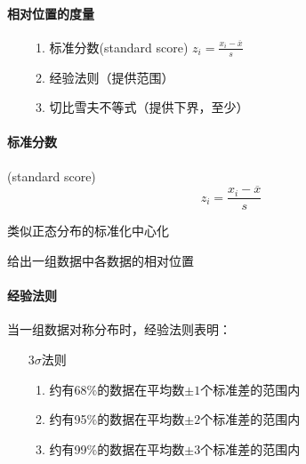 \documentclass[UTF8,10pt]{book}
\begin{document}
                \paragraph{相对位置的度量}
                    \begin{itemize}
                        \item [] {
                            \begin{enumerate}
                                \item 标准分数(standard score) $ z_i = \frac{x_i-\overline{x}}{s} $
                                \item 经验法则（提供范围）
                                \item 切比雪夫不等式（提供下界，至少）
                            
                            \end{enumerate}
                        }
                    \end{itemize}
                \paragraph{标准分数} (standard score) $$ z_i = \frac{x_i-\overline{x}}{s} $$

                {\kaishu 类似正态分布的标准化中心化}

                {\kaishu 给出一组数据中各数据的相对位置}

                \paragraph{经验法则} 当一组数据对称分布时，经验法则表明：
                    \begin{itemize}
                        \item [$3\sigma$法则] {
                            \begin{enumerate}
                                \item 约有68\%的数据在平均数$\pm 1$个标准差的范围内
                                \item 约有95\%的数据在平均数$\pm 2$个标准差的范围内
                                \item 约有99\%的数据在平均数$\pm 3$个标准差的范围内
                            
                            \end{enumerate}
                        }
                    \end{itemize}
\end{document}

